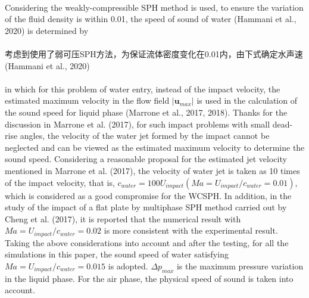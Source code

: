 \documentclass[UTF8]{ctexart}
\begin{document}
{{\paragraph{\quad}Considering the weakly-compressible SPH method is used, 
                to ensure the variation of the fluid density is within 0.01, 
                the speed of sound of water (Hammani et al., 2020) is determined by
\paragraph{\quad}考虑到使用了弱可压SPH方法，为保证流体密度变化在0.01内，由下式确定水声速(Hammani et al., 2020)


\paragraph{\quad}in which for this problem of water entry, instead of the 
                impact velocity, the estimated maximum velocity in the 
                flow field $|\mathbf{u}_{max}|$ is used in the calculation of the sound 
                speed for liquid phase (Marrone et al., 2017, 2018). 
                Thanks for the discussion in Marrone et al. (2017), 
                for such impact problems with small dead-rise angles, 
                the velocity of the water jet formed by the impact cannot 
                be neglected and can be viewed as the estimated maximum 
                velocity to determine the sound speed. Considering a 
                reasonable proposal for the estimated jet velocity mentioned 
                in Marrone et al. (2017), the velocity of water jet is taken as 
                10 times of the impact velocity, that is, $c_{water} = 100U_{impact} 
                (Ma = U_{impact}/c_{water} = 0.01)$, which is considered as a good 
                compromise for the WCSPH. In addition, in the study of the impact 
                of a flat plate by multiphase SPH method carried out by Cheng et al. 
                (2017), it is reported that the numerical result with 
                $Ma = U_{impact}/c_{water} = 0.02$ is more consistent with the experimental 
                result. Taking the above considerations into account and after the 
                testing, for all the simulations in this paper, the sound speed of water 
                satisfying $Ma = U_{impact}/c_{water} = 0.015$ is adopted. $\Delta p_{max}$ is the maximum 
                pressure variation in the liquid phase. For the air phase, the physical 
                speed of sound is taken into account.
}}
\end{document}
